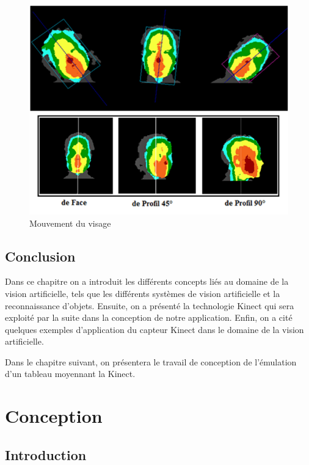 \documentclass[12pt,a4paper,oneside]{book}
\begin{document}
	\begin{figure}[H]
		\centering
		\includegraphics[scale=0.6]{images/v1.png}
		\caption{ Mouvement du visage }
		\label{fig1f}
	\end{figure}
	
	
	
	\section{Conclusion}
	Dans ce chapitre on a introduit les différents concepts liés au domaine de la vision artificielle, tels que les différents systèmes de vision artificielle et la reconnaissance d'objets.
	Ensuite, on a présenté la technologie Kinect qui sera exploité par la suite dans la conception de notre application.
	Enfin, on a cité quelques exemples d'application du capteur Kinect dans le domaine de la vision artificielle.
	
	Dans le chapitre suivant, on présentera le travail de conception de l'émulation d'un tableau moyennant la Kinect.
	
	
	
	
	
	
	\chapter{Conception}
	
	\section{Introduction}
	
\end{document}
